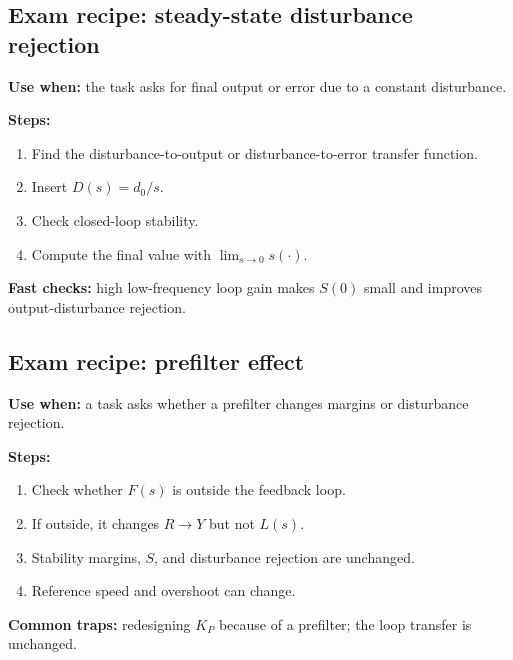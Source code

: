 \subsection{Exam recipe: steady-state disturbance rejection}

\textbf{Use when:} the task asks for final output or error due to a constant disturbance.

\textbf{Steps:}
\begin{enumerate}
\item Find the disturbance-to-output or disturbance-to-error transfer function.
\item Insert \(D(s)=d_0/s\).
\item Check closed-loop stability.
\item Compute the final value with \(\lim_{s\to0}s(\cdot)\).
\end{enumerate}

\textbf{Fast checks:} high low-frequency loop gain makes \(S(0)\) small and improves output-disturbance rejection.

\subsection{Exam recipe: prefilter effect}

\textbf{Use when:} a task asks whether a prefilter changes margins or disturbance rejection.

\textbf{Steps:}
\begin{enumerate}
\item Check whether \(F(s)\) is outside the feedback loop.
\item If outside, it changes \(R\to Y\) but not \(L(s)\).
\item Stability margins, \(S\), and disturbance rejection are unchanged.
\item Reference speed and overshoot can change.
\end{enumerate}

\textbf{Common traps:} redesigning \(K_P\) because of a prefilter; the loop transfer is unchanged.
